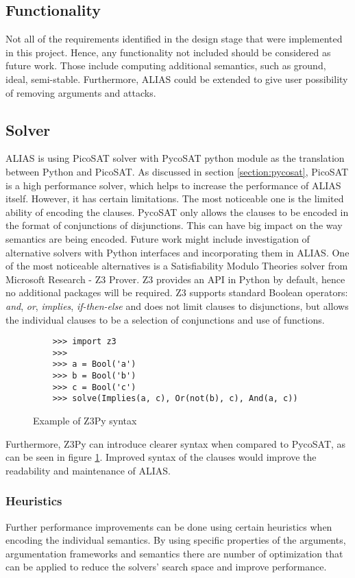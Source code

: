 \subsection{Functionality}
Not all of the requirements identified in the design stage that were implemented in this project. Hence, any functionality not included should be considered as future work. Those include computing additional semantics, such as ground, ideal, semi-stable. Furthermore, ALIAS could be extended to give user possibility of removing arguments and attacks. 

\subsection{Solver}
ALIAS is using PicoSAT solver with PycoSAT python module as the translation between Python and PicoSAT. As discussed in section \ref{section:pycosat}, PicoSAT is a high performance solver, which helps to increase the performance of ALIAS itself. However, it has certain limitations. The most noticeable one is the limited ability of encoding the clauses. PycoSAT only allows the clauses to be encoded in the format of conjunctions of disjunctions. This can have big impact on the way semantics are being encoded. Future work might include investigation of alternative solvers with Python interfaces and incorporating them in ALIAS. One of the most noticeable alternatives is a Satisfiability Modulo Theories solver from Microsoft Research - Z3 Prover. Z3 provides an API in Python by default, hence no additional packages will be required. Z3 supports standard Boolean operators: \textit{and}, \textit{or}, \textit{implies}, \textit{if-then-else} and does not limit clauses to disjunctions, but allows the individual clauses to be a selection of conjunctions and use of functions. 

\begin{figure}
	\begin{verbatim}
	>>> import z3
	>>>
	>>> a = Bool('a')
	>>> b = Bool('b')
	>>> c = Bool('c')
	>>> solve(Implies(a, c), Or(not(b), c), And(a, c))
	\end{verbatim}
	\caption{Example of Z3Py syntax}
	\label{fig:z3}
\end{figure}

Furthermore, Z3Py can introduce clearer syntax when compared to PycoSAT, as can be seen in figure \ref{fig:z3}. Improved syntax of the clauses would improve the readability and maintenance of ALIAS. 

\subsubsection{Heuristics}
Further performance improvements can be done using certain heuristics when encoding the individual semantics. By using specific properties of the arguments, argumentation frameworks and semantics there are number of optimization that can be applied to reduce the solvers' search space and improve performance.

